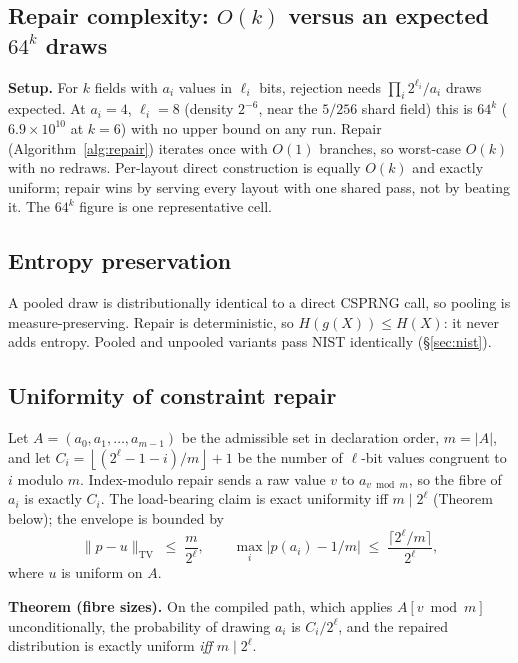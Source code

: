 \documentclass{svproc}
\begin{document}
\subsection{Repair complexity: $O(k)$ versus an expected $64^k$ draws}
\label{sec:repair-complexity}

\textbf{Setup.} For $k$ fields with $a_i$ values in $\ell_i$ bits, rejection needs $\prod_i 2^{\ell_i}/a_i$ draws expected. At $a_i=4$, $\ell_i=8$ (density $2^{-6}$, near the $5/256$ shard field) this is $64^k$ ($6.9\times10^{10}$ at $k=6$) with no upper bound on any run. Repair (Algorithm~\ref{alg:repair}) iterates once with $O(1)$ branches, so worst-case $O(k)$ with no redraws. Per-layout direct construction is equally $O(k)$ and exactly uniform; repair wins by serving every layout with one shared pass, not by beating it. The $64^k$ figure is one representative cell.

\subsection{Entropy preservation}
\label{sec:entropy}

A pooled draw is distributionally identical to a direct CSPRNG call, so pooling is measure-preserving. Repair is deterministic, so $H(g(X)) \leq H(X)$: it never adds entropy. Pooled and unpooled variants pass NIST identically (\S\ref{sec:nist}).

\subsection{Uniformity of constraint repair}
\label{sec:uniformity}

Let $A = (a_0, a_1, \dots, a_{m-1})$ be the admissible set in declaration order, $m = |A|$, and let $C_i = \left\lfloor (2^\ell - 1 - i)/m \right\rfloor + 1$ be the number of $\ell$-bit values congruent to $i$ modulo $m$. Index-modulo repair sends a raw value $v$ to $a_{v \bmod m}$, so the fibre of $a_i$ is exactly $C_i$. The load-bearing claim is exact uniformity iff $m \mid 2^\ell$ (Theorem below); the envelope is bounded by
\[
  \|p - u\|_{\mathrm{TV}} \;\le\; \frac{m}{2^\ell}, \qquad
  \max_i |p(a_i) - 1/m| \;\le\; \frac{\lceil 2^\ell/m \rceil}{2^\ell},
\]
where $u$ is uniform on $A$.

\textbf{Theorem (fibre sizes).} On the compiled path, which applies $A[v \bmod m]$ unconditionally, the probability of drawing $a_i$ is $C_i / 2^\ell$, and the repaired distribution is exactly uniform \emph{iff} $m \mid 2^\ell$.
\end{document}
